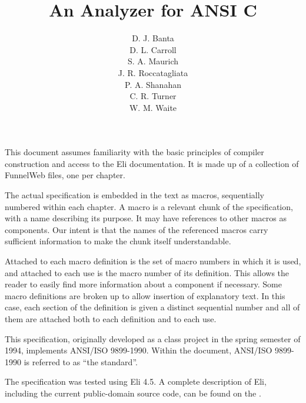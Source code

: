 \title{An Analyzer for ANSI C}
\author{D. J. Banta\\
D. L. Carroll\\
S. A. Maurich\\
J. R. Roccatagliata\\
P. A. Shanahan\\
C. R. Turner\\
W. M. Waite}
\maketitle

This document assumes familiarity with the basic principles of compiler
construction and access to the Eli documentation.
It is made up of a collection of FunnelWeb files, one per chapter.

The actual specification is embedded in the text as macros, sequentially
numbered within each chapter.
A macro is a relevant chunk of the specification, with a name describing
its purpose.
It may have references to other macros as components.
Our intent is that the names of the referenced macros carry sufficient
information to make the chunk itself understandable.

Attached to each macro definition is the set of macro numbers in which it
is used, and attached to each use is the macro number of its definition.
This allows the reader to easily find more information about a component
if necessary.
Some macro definitions are broken up to allow insertion of explanatory text.
In this case, each section of the definition is given a distinct sequential
number and all of them are attached both to each definition and to each use.

This specification, originally developed as a class project in the spring
semester of 1994, implements ANSI/ISO 9899-1990.
Within the document, ANSI/ISO 9899-1990 is referred to as ``the standard''.

The specification was tested using Eli 4.5.
A complete description of Eli, including the current public-domain source
code, can be found on the
.

\newpage

\tableofcontents
